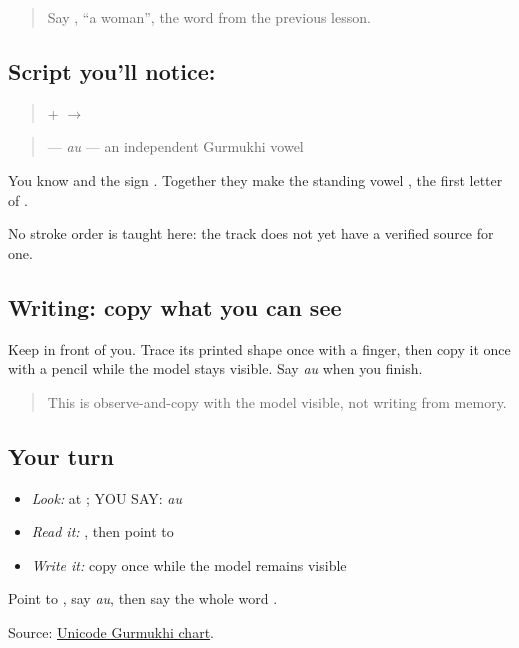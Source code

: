 \begin{quote}
Say \textbf{}, \textquotedblleft{}a woman\textquotedblright{}, the word from the previous lesson.
\end{quote}

\subsection*{Script you'll notice: }
\begin{quote}
\textbf{} + \textbf{} $\to$ \textbf{}
\end{quote}

\begin{quote}
\textbf{} — \emph{au} — an independent Gurmukhi vowel
\end{quote}

You know \textbf{} and the sign \textbf{}. Together they make the standing vowel \textbf{}, the first letter of \textbf{}.

No stroke order is taught here: the track does not yet have a verified source for one.

\subsection*{Writing: copy what you can see}
Keep \textbf{} in front of you. Trace its printed shape once with a finger, then copy it once with a pencil while the model stays visible. Say \emph{au} when you finish.

\begin{quote}
This is observe-and-copy with the model visible, not writing from memory.
\end{quote}

\subsection*{Your turn}
\begin{itemize}
\raggedright
  \item \emph{Look:} at \textbf{}; YOU SAY: \emph{au}
  \item \emph{Read it:} \textbf{}, then point to \textbf{}
  \item \emph{Write it:} copy \textbf{} once while the model remains visible
\end{itemize}

\begin{tcolorbox}[breakable,colback=teal!4,colframe=teal!35!black,title={Before you move on}]
Point to \textbf{}, say \emph{au}, then say the whole word \textbf{}.

Source: \href{https://www.unicode.org/charts/PDF/U0A00.pdf}{Unicode Gurmukhi chart}.
\end{tcolorbox}
